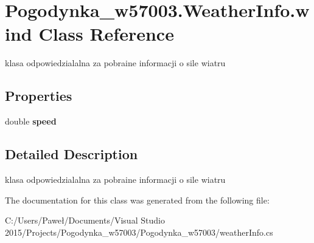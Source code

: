 \hypertarget{class_pogodynka__w57003_1_1_weather_info_1_1wind}{}\section{Pogodynka\+\_\+w57003.\+Weather\+Info.\+wind Class Reference}
\label{class_pogodynka__w57003_1_1_weather_info_1_1wind}


klasa odpowiedzialalna za pobraine informacji o sile wiatru  


\subsection*{Properties}
\begin{DoxyCompactItemize}
\item 
\mbox{\label{class_pogodynka__w57003_1_1_weather_info_1_1wind_a5daace24b18b430d76a439ec5c8b3bb9}} 
double {\bfseries speed}
\end{DoxyCompactItemize}


\subsection{Detailed Description}
klasa odpowiedzialalna za pobraine informacji o sile wiatru 



The documentation for this class was generated from the following file\+:\begin{DoxyCompactItemize}
\item 
C\+:/\+Users/\+Paweł/\+Documents/\+Visual Studio 2015/\+Projects/\+Pogodynka\+\_\+w57003/\+Pogodynka\+\_\+w57003/weather\+Info.\+cs\end{DoxyCompactItemize}
